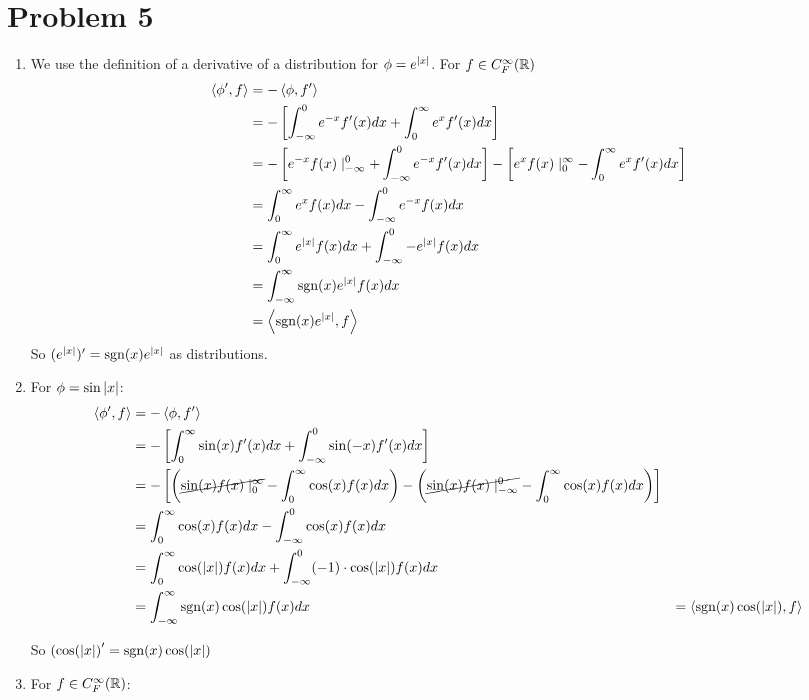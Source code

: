 \documentclass[12pt]{article}%
\newcommand{\disip}[2]{\left\langle #1, #2 \right\rangle}
\newcommand{\posinfint}[1][0]{\int_{#1}^\infty}
\newcommand{\neginfint}[1][0]{\int_{-\infty}^{#1}}
\begin{document}
\section{Problem 5}
\begin{enumerate}
  \item We use the definition of a derivative of a distribution for $\phi = e^{\abs{x}}$. For $f \in C_F^{\infty}({\mathbb{R}})$
  \begin{align*}
    \disip{\phi'}{f} & = - \disip{\phi}{f'} \\
  &   = - \left[\int_{-\infty}^0 e^{-x}f'(x) dx + \int_0^{\infty} e^x f'(x) dx \right] \\
  & =  - \left[e^{-x}f(x)\mid_{-\infty}^0  + \int_{-\infty}^0 e^{-x}f'(x) dx \right] - \left[e^xf(x)\mid_0^\infty -  \int_0^{\infty} e^x f'(x) dx\right] \\
  & = \int_0^{\infty} e^x f(x) dx - \int_{-\infty}^0 e^{-x} f(x) dx \\
  & = \int_0^{\infty} e^{\abs{x}} f(x) dx  + \int_{-\infty}^0 -e^{\abs{x}} f(x) dx \\
  & = \doubinfint \text{sgn}(x)e^{\abs{x}}f(x) dx \\
  & = \disip{ \text{sgn}(x)e^{\abs{x}}}{f}
  \end{align*}
  So $(e^{\abs{x}})' = \text{sgn}(x)e^{\abs{x}}$ as distributions.

  \item
  For $\phi = \sin{\abs{x}}$:
  \begin{align*}
    \disip{\phi'}{f} & = - \disip{\phi}{f'} \\
    & = - \left[ \posinfint \sin(x) f'(x)dx + \neginfint \sin(-x)f'(x) dx  \right] \\
    & =  - \left[ \left( \cancel{\sin(x)f(x)\mid_0^{\infty}} - \posinfint \cos(x)f(x)dx\right) - \left(\cancel{\sin(x)f(x)\mid_{-\infty}^0}  - \posinfint \cos(x)f(x) dx\right) \right] \\
    & = \posinfint \cos(x)f(x) dx - \neginfint \cos(x)f(x) dx \\
    & = \posinfint \cos(\abs{x})f(x) dx + \neginfint (-1) \cdot \cos(\abs{x})f(x) dx \\
    & = \doubinfint \text{sgn}(x) \cos(\abs{x}) f(x)dx
    & = \disip{\text{sgn}(x) \cos(\abs{x})}{f}
  \end{align*}

  So $(\cos(\abs{x})' = \text{sgn}(x) \cos(\abs{x})$

  \item
  For $f \in C_F^{\infty}({\mathbb{R}})$:


\end{enumerate}
\end{document}
